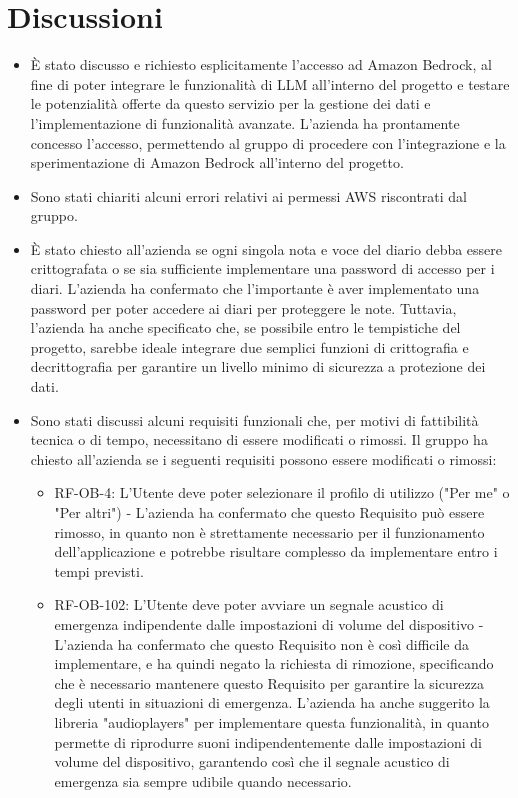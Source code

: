\documentclass[a4paper,12pt]{article}
\begin{document}
\section{Discussioni}
\begin{itemize}
    \item È stato discusso e richiesto esplicitamente l'accesso ad Amazon Bedrock, al fine di poter integrare le funzionalità di LLM all'interno del progetto e testare le potenzialità offerte da questo servizio per la gestione dei dati e l'implementazione di funzionalità avanzate. L'azienda ha prontamente concesso l'accesso, permettendo al gruppo di procedere con l'integrazione e la sperimentazione di Amazon Bedrock all'interno del progetto.
    \item Sono stati chiariti alcuni errori relativi ai permessi AWS riscontrati dal gruppo.
    \item È stato chiesto all'azienda se ogni singola nota e voce del diario debba essere crittografata o se sia sufficiente implementare una password di accesso per i diari. L'azienda ha confermato che l'importante è aver implementato una password per poter accedere ai diari per proteggere le note. Tuttavia, l'azienda ha anche specificato che, se possibile entro le tempistiche del progetto, sarebbe ideale integrare due semplici funzioni di crittografia e decrittografia per garantire un livello minimo di sicurezza a protezione dei dati.
    \item Sono stati discussi alcuni requisiti funzionali che, per motivi di fattibilità tecnica o di tempo, necessitano di essere modificati o rimossi. Il gruppo ha chiesto all'azienda se i seguenti requisiti possono essere modificati o rimossi:
    \begin{itemize}
        \item RF-OB-4: L'Utente deve poter selezionare il profilo di utilizzo ("Per me" o "Per altri") - L'azienda ha confermato che questo Requisito può essere rimosso, in quanto non è strettamente necessario per il funzionamento dell'applicazione e potrebbe risultare complesso da implementare entro i tempi previsti.
        \item RF-OB-102: L'Utente deve poter avviare un segnale acustico di emergenza indipendente dalle impostazioni di volume del dispositivo - L'azienda ha confermato che questo Requisito non è così difficile da implementare, e ha quindi negato la richiesta di rimozione, specificando che è necessario mantenere questo Requisito per garantire la sicurezza degli utenti in situazioni di emergenza. L'azienda ha anche suggerito la libreria "audioplayers" per implementare questa funzionalità, in quanto permette di riprodurre suoni indipendentemente dalle impostazioni di volume del dispositivo, garantendo così che il segnale acustico di emergenza sia sempre udibile quando necessario.

\end{itemize}
\end{itemize}
\end{document}
